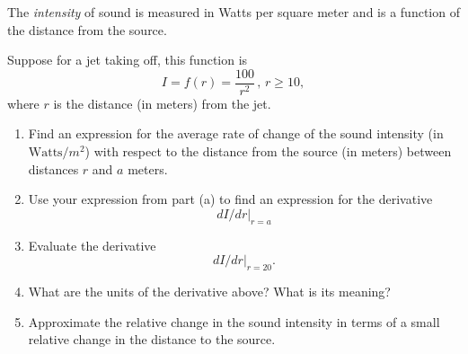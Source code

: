 \documentclass{ximera}
\begin{document}
\begin{question}  \label{Qdfdgt446666}
The \emph{intensity} of sound is measured in Watts per square meter and is a function of the distance from the source. 

Suppose for a jet taking off, this function is
\[
          I = f(r) = \frac{100}{r^2} \, , \, r\geq 10 ,
\]
where $r$ is the distance (in meters) from the jet.    %

\begin{enumerate}

\item Find an expression for the average rate of change of the sound intensity (in $\text{Watts}/m^2$) with respect to the distance from the source (in meters) between distances $r$ and $a$ meters.

\item Use your expression from part (a) to find an expression for the derivative 
\[
   dI/dr \Big|_{r=a} 
\]

\item Evaluate the derivative
\[
       dI/dr \Big|_{r=20} .
\]

\item What are the units of the derivative above? What is its meaning?

\item Approximate the relative change in the sound intensity in terms of a small relative change in the distance to the source.
\end{enumerate}

\end{question}
\end{document}
